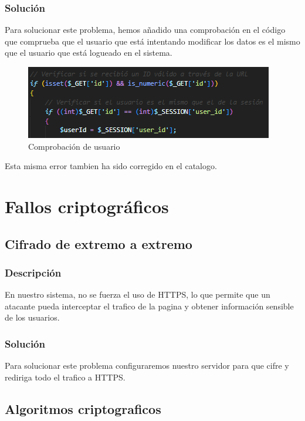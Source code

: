 \documentclass{report}
\begin{document}
                \subsubsection{Solución}
                    Para solucionar este problema, hemos añadido una comprobación en el código que comprueba que el usuario que está intentando modificar los datos es el mismo que el usuario que está logueado en el sistema.
                    \begin{figure}[H]
                        \centering
                        \includegraphics[width=\textwidth]{./img/vulnerabilidades/3.1.1.4.png}
                        \caption{Comprobación de usuario}
                    \end{figure}
                    Esta misma error tambien ha sido corregido en el catalogo.
        
        \clearpage
        \section{Fallos criptográficos}
            \subsection{Cifrado de extremo a extremo}
                \subsubsection{Descripción}
                    En nuestro sistema, no se fuerza el uso de HTTPS, lo que permite que un atacante pueda interceptar el trafico de la pagina y obtener información sensible de los usuarios.
                \subsubsection{Solución}
                    Para solucionar este problema configuraremos nuestro servidor para que cifre y rediriga todo el trafico a HTTPS.
            \subsection{Algoritmos criptograficos}
\end{document}
